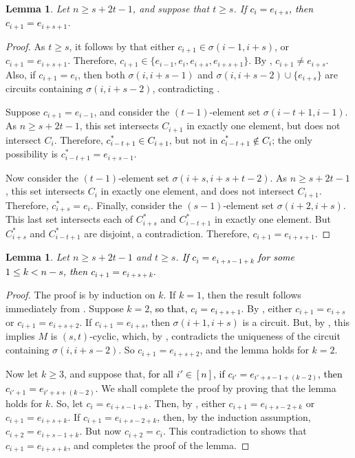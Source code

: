 \documentclass[11pt]{amsart}
\newtheorem{lemma}[theorem]{Lemma}
\newcommand{\blue}{\textcolor{black}}
\newcommand{\bloo}{\textcolor{black}}
\begin{document}
\begin{lemma}
\label{gap1}
Let $n \geq s + 2t - 1$, and suppose that $t\ge s$. If \bloo{$c_{i}=e_{i+s}$, then $c_{i+1}=e_{i+s+1}$}.
\end{lemma}

\begin{proof}
As $t\ge s$, it follows by  that either $c_{i+1} \in \sigma(i-1,i+s)$, or $c_{i+1} = e_{i+s+1}$. Therefore, $c_{i+1} \in \{e_{i-1},e_i,e_{i+s},e_{i+s+1}\}$. By , $c_{i+1} \neq e_{i+s}$. Also, if $c_{i+1} = e_i$, then both $\sigma(i, i+s-1)$ and $\sigma(i, i+s-2) \cup \{e_{i+s}\}$ are circuits containing $\sigma(i, i+s-2)$, contradicting .

Suppose $c_{i+1} = e_{i-1}$, and consider the $(t-1)$-element set $\sigma(i-t+1, i-1)$. As $n\ge s+2t-1$, this set intersects $C_{i+1}$ in exactly one element, but does not intersect $C_i$. Therefore, \bloo{$c^*_{i-t+1} \in C_{i+1}$}, but not in \bloo{$c^*_{i-t+1} \notin C_i$}; the only possibility is $c^*_{i-t+1} = e_{i+s-1}$.

Now consider the $(t-1)$-element set $\sigma(i+s, i+s+t-2)$. As $n\ge s+2t-1$, this set intersects $C_i$ in exactly one element, and does not intersect $C_{i+1}$. Therefore, $c^*_{i+s}=e_i$. Finally, consider the $(s-1)$-element set $\sigma(i+2, i+s)$. This last set intersects each of $C^*_{i+s}$ and $C^*_{i-t+1}$ in exactly one element. But $C^*_{i+s}$ and $C^*_{i-t+1}$ are disjoint, a contradiction. Therefore, $c_{i+1} = e_{i+s+1}$.
\end{proof}

\begin{lemma}
\label{allgap}
Let $n \geq s+2t-1$ and $t \geq s$. \bloo{If $c_i=e_{i+s-1+k}$ for some $1 \leq k < n-s$, then $c_{i+1} = e_{i+s+k}$}.
\end{lemma}

\begin{proof}
The proof is by induction on $k$. If $k=1$, then the result follows immediately from . Suppose $k = 2$, \blue{so that, $c_i = e_{i+s+1}$}. By , either $c_{i+1} = e_{i+s}$ or $c_{i+1} = e_{i+s+2}$. If $c_{i+1} = e_{i+s}$, then $\sigma(i+1,i+s)$ is a circuit. But, by , this implies $M$ is $(s, t)$-cyclic, which, by , contradicts the uniqueness of the circuit containing $\sigma(i, i+s-2)$. So $c_{i+1} = e_{i+s+2}$, and the lemma holds for $k=2$.

Now let $k\ge 3$, and suppose that, \bloo{for all $i' \in [n]$, if $c_{i'} = e_{i'+s-1+(k-2)}$, then $c_{i'+1} = e_{i'+s+(k-2)}$.} We shall complete the proof by proving that the lemma holds for $k$. So, let $c_i=e_{i+s-1+k}$. Then, by , either $c_{i+1} = e_{i+s-2+k}$ or $c_{i+1} = e_{i+s+k}$. If $c_{i+1}=e_{i+s-2+k}$, then, by the induction assumption, $c_{i+2} = e_{i+s-1+k}$. But now $c_{i+2} = c_i$. This contradiction to  shows that $c_{i+1} = e_{i+s+k}$, and completes the proof of the lemma.
\end{proof}
\end{document}
